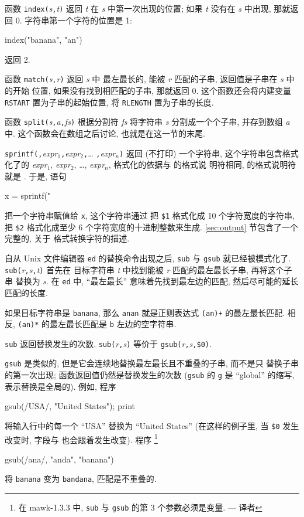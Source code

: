 函数 \verb'index('\textit{s}\verb','\textit{t}\verb')' 返回 \textit{t} 在
\textit{s} 中第一次出现的位置; 如果 \textit{t} 没有在 \textit{s} 中出现,
那就返回 0. 字符串第一个字符的位置是 1:
\begin{myverb}
    index("banana", "an")
\end{myverb}
返回 2.

函数 \verb'match('\textit{s}\verb','\textit{r}\verb')' 返回 \textit{s} 中
最左最长的, 能被 \textit{r} 匹配的子串, 返回值是子串在 \textit{s} 中的开始
位置, 如果没有找到相匹配的子串, 那就返回 0. 这个函数还会将内建变量
\verb'RSTART' 置为子串的起始位置, 将 \verb'RLENGTH' 置为子串的长度.

函数 \verb'split('\textit{s}\verb','\textit{a}\verb','\textit{fs}\verb')'
根据分割符 \textit{fs} 将字符串 \textit{s} 分割成一个个子串, 并存到数组
\textit{a} 中. 这个函数会在数组之后讨论, 也就是在这一节的末尾.

\verb'sprintf('\fmt\verb','\textit{expr}$_1$\verb','\textit{expr}$_2$\verb','\ldots%
\verb','\textit{expr}$_n$\verb')' 返回 (不打印) 一个字符串,
这个字符串包含格式%
化了的
\textit{expr}$_1$, \textit{expr}$_2$, \ldots, \textit{expr}$_n$,
格式化的依据与 \printf 的格式说
明符相同, \printf 的格式说明符就是 \fmt. 于是, 语句
\begin{myverb}
    x = sprintf("%
\end{myverb}
把一个字符串赋值给 \verb'x', 这个字符串通过%
把 \verb'$1' 格式化成 10 个字符宽度的字符串, 把 \verb'$2' 格式化成至少 6
个字符宽度的十进制整数来生成. \ref{sec:output} 节包含了一个完整的, 关于
格式转换字符的描述.

自从 Unix 文件编辑器 \verb'ed' 的替换命令出现之后, \verb'sub' 与
\verb'gsub' 就已经被模式化了.
\verb'sub('\textit{r}\verb','\textit{s}\verb','\textit{t}\verb')' 首先在
目标字符串 \textit{t} 中找到能被 \textit{r} 匹配的最左最长子串,
再将这个子串
替换为 \textit{s}. 在 \verb'ed' 中, ``最左最长'' 意味着先找到最左边的匹配,
然后尽可能的延长匹配的长度.

如果目标字符串是 \verb'banana', 那么 \verb'anan' 就是正则表达式
\verb'(an)+' 的最左最长匹配. 相反, \verb'(an)*' 的最左最长匹配是 \verb'b'
左边的空字符串.

\verb'sub' 返回替换发生的次数.
\verb'sub('\textit{r}\verb','\textit{s}\verb')' 等价于
\verb'gsub('\textit{r}\verb','\textit{s}\verb','\verb'$0'\verb')'.

\verb'gsub' 是类似的, 但是它会连续地替换最左最长且不重叠的子串, 而不是只
替换子串的第一次出现; 函数返回值仍然是替换发生的次数
(\verb'gsub' 的 \verb'g' 是 ``global'' 的缩写, 表示替换是全局的). 例如,
程序
\begin{myverb}
    { gsub(/USA/, "United States"); print }
\end{myverb}
将输入行中的每一个 ``USA'' 替换为 ``United States'' (在这样的例子里,
当 \verb'$0' 发生改变时, 字段与 \nf 也会跟着发生改变). 程序
\footnote{在 mawk-1.3.3 中, \texttt{sub} 与 \texttt{gsub}
的第 3 个参数必须是变量. --- 译者}
\begin{myverb}
    gsub(/ana/, "anda", "banana")
\end{myverb}
将 \verb'banana' 变为 \verb'bandana', 匹配是不重叠的.

